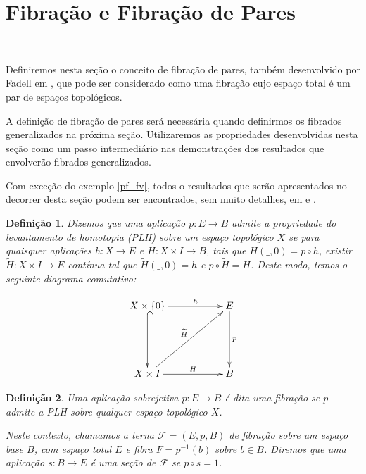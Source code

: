 \documentclass[12pt,oneside]{book} %
\newtheorem{defi}   {\hspace{0.5cm}Defini\c c\~ao}[chapter]
\newcommand{\wt}{\widetilde}
\begin{document}



\section{Fibração e Fibração de Pares}\label{secao_fib_pares}

\

\par Definiremos nesta seção o conceito de fibração de pares, também desenvolvido por Fadell em \cite{fadell_1}, que pode ser considerado como uma fibração cujo espaço total é um par de espaços topológicos.

\par A definição de fibração de pares será necessária quando definirmos os fibrados generalizados na próxima seção. Utilizaremos as propriedades desenvolvidas nesta seção como um passo intermediário nas demonstrações dos resultados que envolverão fibrados generalizados.

\par Com exceção do exemplo \ref{pf_fv}, todos o resultados que serão apresentados no decorrer desta seção podem ser encontrados, sem muito detalhes, em \cite{fadell_1} e \cite{brown}.

\begin{defi}\label{PLH}
	Dizemos que uma aplicação $p:E\to B$ admite a propriedade do levantamento de homotopia (PLH) sobre um espaço topológico $X$ se para quaisquer aplicações $h:X\to E$ e $H:X\times I\to B$, tais que $H(\_,0)=p\circ h$, existir $\wt{H}:X\times I\to E$ contínua tal que $\wt{H}(\_,0)=h$ e $p\circ\wt{H}=H$. Deste modo, temos o seguinte diagrama comutativo:
	
	$$ \xymatrix @C=0.5cm {
		X\times \{ 0 \} \ar[rrr]^-{h} \ar@{^(->}[dd] &&& E \ar[dd]^-{p} \\
		&&& \\
		X\times I \ar[rrr]^-{H} \ar[rrruu]^-{\wt{H}} &&& B
	}$$
\end{defi}

\begin{defi}
	Uma aplicação sobrejetiva $p:E\to B$ é dita uma fibração se $p$ admite a PLH sobre qualquer espaço topológico $X$.
	
	\par Neste contexto, chamamos a terna $\mathcal{F}=(E,p,B)$ de fibração sobre um espaço base $B$, com espaço total $E$ e fibra $F=p^{-1}(b)$ sobre $b\in B$. Diremos que uma aplicação $s:B\to E$ é uma seção de $\mathcal{F}$ se $p\circ s=1$.
\end{defi}
\end{document}
